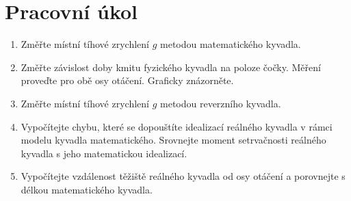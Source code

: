\documentclass{article}
\author{"Patrik Novotný"}
\begin{document}
\section*{Pracovní úkol}
\begin{enumerate}
\item Změřte místní tíhové zrychlení $g$ metodou matematického kyvadla.
\item Změřte závislost doby kmitu fyzického kyvadla na poloze čočky. Měření proveďte pro obě osy otáčení. Graficky znázorněte.
\item Změřte místní tíhové zrychlení $g$ metodou reverzního kyvadla.
\item Vypočítejte chybu, které se dopouštíte idealizací reálného kyvadla v rámci modelu kyvadla matematického. Srovnejte moment setrvačnosti reálného kyvadla s jeho matematickou idealizací.
\item Vypočítejte vzdálenost těžiště reálného kyvadla od osy otáčení a porovnejte s délkou matematického kyvadla.
\end{enumerate}
\end{document}
